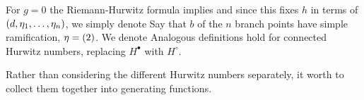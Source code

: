 \documentclass[../main/main.tex]{subfiles}
\begin{document}
For $g=0$ the Riemann-Hurwitz formula implies
and since this fixes $h$ in terms of $(d,\eta_1,\ldots,\eta_n)$, we simply denote
Say that $b$ of the $n$ branch points have simple ramification, \ie $\eta=(2)$. We denote
Analogous definitions hold for connected Hurwitz numbers, replacing $H^\bullet$ with $H^\circ$. 

Rather than considering the different Hurwitz numbers separately, it worth to collect them together into generating functions. 
\end{document}

